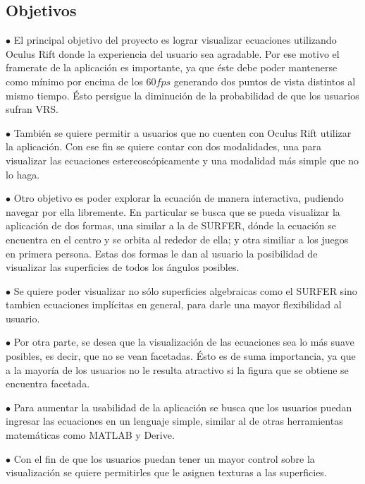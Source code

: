 \documentclass[12pt]{article}
\begin{document}
\subsection{Objetivos}
$\bullet$ El principal objetivo del proyecto es lograr visualizar ecuaciones utilizando Oculus Rift donde  la experiencia del usuario sea agradable. Por ese motivo el framerate de la aplicación es importante, ya que éste debe poder mantenerse como mínimo por encima de los $60 fps$ generando dos puntos de vista distintos al mismo tiempo. Ésto persigue la diminución de la probabilidad de que los usuarios sufran VRS. 

$\bullet$ También se quiere permitir a usuarios que no cuenten con Oculus Rift utilizar la aplicación. Con ese fin se quiere contar con dos modalidades, una para visualizar las ecuaciones estereoscópicamente y una modalidad más simple que no lo haga.

$\bullet$ Otro objetivo es poder explorar la ecuación de manera interactiva, pudiendo navegar por ella libremente. En particular se busca que se pueda visualizar la aplicación de dos formas, una similar a la de SURFER, dónde la ecuación se encuentra en el centro y se orbita al rededor de ella; y otra similiar a los juegos en primera persona. Estas dos formas le dan al usuario la posibilidad de visualizar las superficies de todos los ángulos posibles.

$\bullet$ Se quiere poder visualizar no sólo superficies algebraicas como el SURFER sino tambien ecuaciones implícitas en general, para darle una mayor flexibilidad al usuario.

$\bullet$ Por otra parte, se desea que la visualización de las ecuaciones sea lo más suave posibles, es decir, que no se vean facetadas. Ésto es de suma importancia, ya que a la mayoría de los usuarios no le resulta atractivo si la figura que se obtiene se encuentra facetada.

$\bullet$ Para aumentar la usabilidad de la aplicación se busca que los usuarios puedan ingresar las ecuaciones en un lenguaje simple, similar al de otras herramientas matemáticas como MATLAB y Derive.

$\bullet$ Con el fin de que los usuarios puedan tener un mayor control sobre la visualización se quiere permitirles que le asignen texturas a las superficies. 
\end{document}
